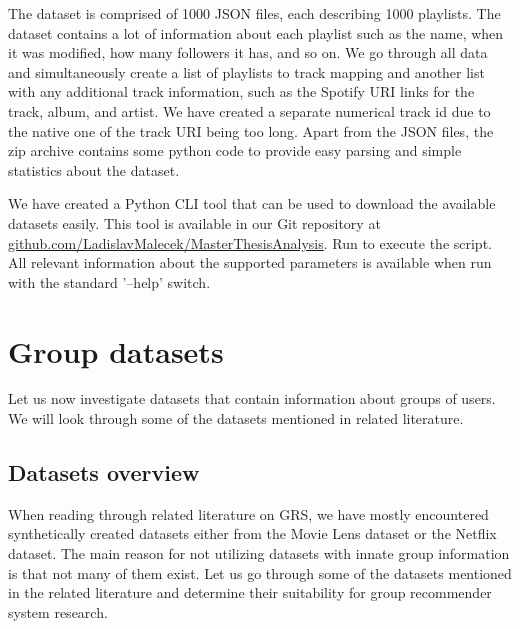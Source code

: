 \begin{itemize}
    
    The dataset is comprised of 1000 JSON files, each describing 1000 playlists. The dataset contains a lot of information about each playlist such as the name, when it was modified, how many followers it has, and so on. We go through all data and simultaneously create a list of playlists to track mapping and another list with any additional track information, such as the Spotify URI links for the track, album, and artist. We have created a separate numerical track id due to the native one of the track URI being too long. Apart from the JSON files, the zip archive contains some python code to provide easy parsing and simple statistics about the dataset.
    
\end{itemize}





We have created a Python CLI tool that can be used to download the available datasets easily. This tool is available in our Git repository at \newline\href{https://github.com/LadislavMalecek/MasterThesisAnalysis}{github.com/LadislavMalecek/MasterThesisAnalysis}. Run  to execute the script. All relevant information about the supported parameters is available when run with the standard '--help' switch.


\section{Group datasets}
Let us now investigate datasets that contain information about groups of users. We will look through some of the datasets mentioned in related literature.

\subsection{Datasets overview}\label{subsection:04_}

When reading through related literature on GRS, we have mostly encountered synthetically created datasets either from the Movie Lens dataset or the Netflix dataset. The main reason for not utilizing datasets with innate group information is that not many of them exist. Let us go through some of the datasets mentioned in the related literature and determine their suitability for group recommender system research.


